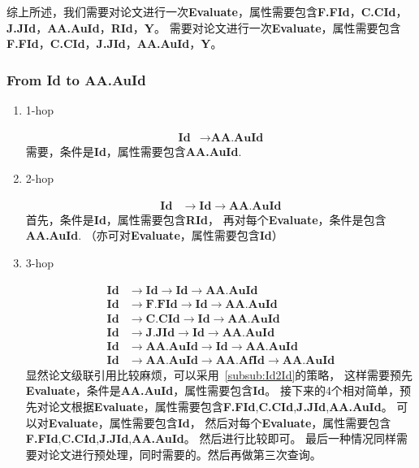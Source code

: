 \documentclass[hyperref,UTF8]{ctexart}
\theoremstyle{definition}
\theoremstyle{remark}
\numberwithin{equation}{subsection}
\newcommand{\Emph}{\textbf}
\newcommand{\Evaluate}{\Emph{Evaluate}}
\newcommand{\Id}{\Emph{Id}}
\newcommand{\RId}{\Emph{RId}}
\newcommand{\FFId}{\Emph{F.FId}}
\newcommand{\CCId}{\Emph{C.CId}}
\newcommand{\JJId}{\Emph{J.JId}}
\newcommand{\AAAuId}{\Emph{AA.AuId}}
\newcommand{\AAAfId}{\Emph{AA.AfId}}
\begin{document}
	综上所述，我们需要对论文进行一次\Evaluate，属性需要包含\FFId，\CCId，\JJId，\AAAuId，\RId，\Emph{Y}。
	需要对论文进行一次\Evaluate，属性需要包含\FFId，\CCId，\JJId，\AAAuId，\Emph{Y}。
	
\subsubsection{From \Emph{Id} to \Emph{AA.AuId}}
\label{subsub:Id2AAAuId}

	\begin{enumerate}[(1)]
		
		\item 1-hop
		
		\begin{align}
			\Id &\rightarrow \AAAuId	
		\end{align}
		需要，条件是\Id，属性需要包含\AAAuId.
		
		\item 2-hop
		
		\begin{align}
			\Id &\rightarrow \Id \rightarrow \AAAuId
		\end{align}
		首先，条件是\Id，属性需要包含\RId，
		再对每个\Evaluate，条件是包含\AAAuId.
		（亦可对\Evaluate，属性需要包含\Id）
		
		\item 3-hop
		
		\begin{align}
			\Id &\rightarrow \Id \rightarrow \Id \rightarrow \AAAuId		\\
			\Id &\rightarrow \FFId \rightarrow \Id \rightarrow \AAAuId	\\
			\Id &\rightarrow \CCId \rightarrow \Id \rightarrow \AAAuId		\\
			\Id &\rightarrow \JJId \rightarrow \Id \rightarrow \AAAuId		\\
			\Id &\rightarrow \AAAuId \rightarrow \Id \rightarrow \AAAuId		\\
			\Id &\rightarrow \AAAuId \rightarrow \AAAfId \rightarrow \AAAuId
		\end{align}
		显然论文级联引用比较麻烦，可以采用~\ref{subsub:Id2Id}的策略，
		这样需要预先\Evaluate，条件是\AAAuId，属性需要包含\Id。
		接下来的4个相对简单，预先对论文根据\Evaluate，属性需要包含\FFId,\CCId,\JJId,\AAAuId。
		可以对\Evaluate，属性需要包含\Id，
		然后对每个\Evaluate，属性需要包含\FFId,\CCId,\JJId,\AAAuId。
		然后进行比较即可。
		最后一种情况同样需要对论文进行预处理，同时需要的。然后再做第三次查询。
		
	\end{enumerate}
	
\end{document}
